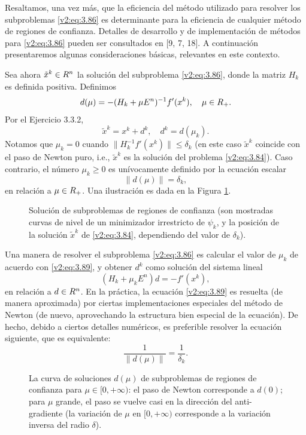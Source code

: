 Resaltamos, una vez más, que la eficiencia del método utilizado para resolver los subproblemas \eqref{v2:eq:3.86} es determinante para la eficiencia de cualquier método de regiones de confianza. Detalles de desarrollo y de implementación de métodos para \eqref{v2:eq:3.86} pueden ser consultados en [9, 7, 18]. A continuación presentaremos algunas consideraciones básicas, relevantes en este contexto.

Sea ahora $\tilde{x}^k \in R^n$ la solución del subproblema \eqref{v2:eq:3.86}, donde la matriz $H_k$ es definida positiva. Definimos
\begin{equation}
    d(\mu) = -(H_k + \mu E^n)^{-1}f'(x^k), \quad \mu \in R_+.
    \label{v2:eq:3.88}
\end{equation}
Por el Ejercicio 3.3.2,
\[
    \tilde{x}^k = x^k + d^k, \quad d^k = d(\mu_k).
\]
Notamos que $\mu_k = 0$ cuando $\|H_k^{-1}f'(x^k)\| \le \delta_k$ (en este caso $\tilde{x}^k$ coincide con el paso de Newton puro, i.e., $\tilde{x}^k$ es la solución del problema \eqref{v2:eq:3.84}). Caso contrario, el número $\mu_k \ge 0$ es unívocamente definido por la ecuación escalar
\begin{equation}
    \|d(\mu)\| = \delta_k,
    \label{v2:eq:3.89}
\end{equation}
en relación a $\mu \in R_+$. Una ilustración es dada en la Figura \ref{v2:fig:3.3.3}.

\begin{figure}[htpb]
    \centering
    \caption{Solución de subproblemas de regiones de confianza (son mostradas curvas de nivel de un minimizador irrestricto de $\psi_k$, y la posición de la solución $\tilde{x}^k$ de \eqref{v2:eq:3.84}, dependiendo del valor de $\delta_k$).}
    \label{v2:fig:3.3.3}
\end{figure}

Una manera de resolver el subproblema \eqref{v2:eq:3.86} es calcular el valor de $\mu_k$ de acuerdo con \eqref{v2:eq:3.89}, y obtener $d^k$ como solución del sistema lineal
\[
    (H_k + \mu_k E^n)d = -f'(x^k),
\]
en relación a $d \in R^n$. En la práctica, la ecuación \eqref{v2:eq:3.89} es resuelta (de manera aproximada) por ciertas implementaciones especiales del método de Newton (de nuevo, aprovechando la estructura bien especial de la ecuación). De hecho, debido a ciertos detalles numéricos, es preferible resolver la ecuación siguiente, que es equivalente:
\[
    \frac{1}{\|d(\mu)\|} = \frac{1}{\delta_k}.
\]

\begin{figure}[htpb]
    \centering
    \caption{La curva de soluciones $d(\mu)$ de subproblemas de regiones de confianza para $\mu \in [0, +\infty)$: el paso de Newton corresponde a $d(0)$; para $\mu$ grande, el paso se vuelve casi en la dirección del anti-gradiente (la variación de $\mu$ en $[0, +\infty)$ corresponde a la variación inversa del radio $\delta$).}
    \label{v2:fig:3.3.4}
\end{figure}

